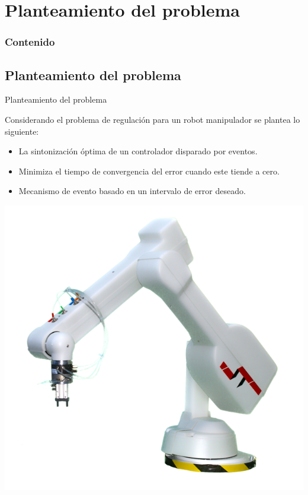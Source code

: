 \section{Planteamiento del problema}{
	\begin{frame}
		\frametitle{Contenido}
	\end{frame}

\subsection{Planteamiento del problema}
\begin{frame}[shrink=20]{Planteamiento del problema}
	\centering
\begin{block}{}
	\justifying
	Considerando el problema de regulación para un robot manipulador se plantea lo siguiente:
	\begin{itemize}
		\item La sintonización óptima de un controlador disparado por eventos.
		\item Minimiza el tiempo de convergencia del error cuando este tiende a cero.
		\item Mecanismo de evento basado en un intervalo de error deseado.
	\end{itemize}
\end{block}
	\centering
	\includegraphics[scale=0.3]{Introduccion/arm-rob.png}
\end{frame}

}
